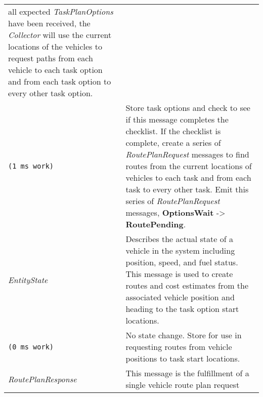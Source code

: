\begin{longtable}[c]{@{}ll@{}}
\begin{minipage}[t]{0.65\columnwidth}
all expected \emph{TaskPlanOptions} have been received, the
\emph{Collector} will use the current locations of the vehicles to
request paths from each vehicle to each task option and from each task
option to every other task option.
\strut\end{minipage}\tabularnewline
\begin{minipage}[t]{0.29\columnwidth}\raggedright\strut
\begin{verbatim}
(1 ms work)
\end{verbatim}
\strut\end{minipage} &
\begin{minipage}[t]{0.65\columnwidth}\raggedright\strut
Store task options and check to see if this message completes the
checklist. If the checklist is complete, create a series of
\emph{RoutePlanRequest} messages to find routes from the current
locations of vehicles to each task and from each task to every other
task. Emit this series of \emph{RoutePlanRequest} messages,
\textbf{OptionsWait} -\textgreater{} \textbf{RoutePending}.
\strut\end{minipage}\tabularnewline
\begin{minipage}[t]{0.29\columnwidth}\raggedright\strut
\emph{EntityState}
\strut\end{minipage} &
\begin{minipage}[t]{0.65\columnwidth}\raggedright\strut
Describes the actual state of a vehicle in the system including
position, speed, and fuel status. This message is used to create routes
and cost estimates from the associated vehicle position and heading to
the task option start locations.
\strut\end{minipage}\tabularnewline
\begin{minipage}[t]{0.29\columnwidth}\raggedright\strut
\begin{verbatim}
(0 ms work)
\end{verbatim}
\strut\end{minipage} &
\begin{minipage}[t]{0.65\columnwidth}\raggedright\strut
No state change. Store for use in requesting routes from vehicle
positions to task start locations.
\strut\end{minipage}\tabularnewline
\begin{minipage}[t]{0.29\columnwidth}\raggedright\strut
\emph{RoutePlanResponse}
\strut\end{minipage} &
\begin{minipage}[t]{0.65\columnwidth}\raggedright\strut
This message is the fulfillment of a single vehicle route plan request

\end{minipage}
\end{longtable}
